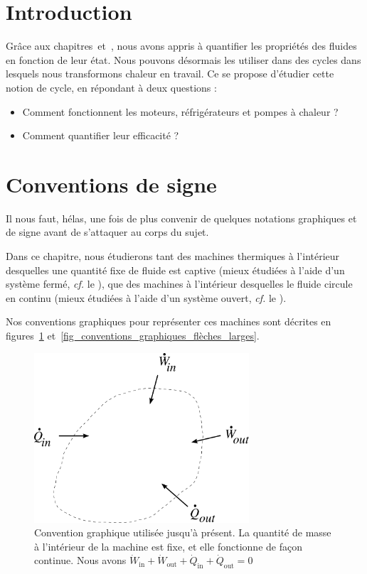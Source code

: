 \section*{Introduction}

	Grâce aux chapitres~\quatre et~\cinq, nous avons appris à quantifier les propriétés des fluides en fonction de leur état. Nous pouvons désormais les utiliser dans des cycles dans lesquels nous transformons chaleur en travail. Ce \courssix se propose d’étudier cette notion de cycle, en répondant à deux questions :

	\begin{itemize}
		\item Comment fonctionnent les moteurs, réfrigérateurs et pompes à chaleur ?
		\item Comment quantifier leur efficacité ?
	\end{itemize}

\dontbreakpage \vspace{2em}


\section{Conventions de signe}

	Il nous faut, hélas, une fois de plus convenir de quelques notations graphiques et de signe avant de s’attaquer au corps du sujet.

	Dans ce chapitre, nous étudierons tant des machines thermiques à l’intérieur desquelles une quantité fixe de fluide est captive (mieux étudiées à l’aide d’un système fermé, \textit{cf.} le \coursdeuxshort), que des machines à l’intérieur desquelles le fluide circule en continu (mieux étudiées à l’aide d’un système ouvert, \textit{cf.} le \courstroisshort).

	Nos conventions graphiques pour représenter ces machines sont décrites en figures~\ref{fig_conventions_graphiques_flèches_petites} et~\ref{fig_conventions_graphiques_flèches_larges}.

	\begin{figure}
		\begin{center}
			\includegraphics[width=8cm]{images/cours6-img3.png}
		\end{center}
		\caption{Convention graphique utilisée jusqu’à présent.
			La quantité de masse à l’intérieur de la machine est fixe, et elle fonctionne de façon continue.
			Nous avons $\dot{W}_\text{in} + \dot{W}_\text{out} + \dot{Q}_\text{in} + \dot{Q}_\text{out} = 0$}
		\label{fig_conventions_graphiques_flèches_petites}
	\end{figure}

